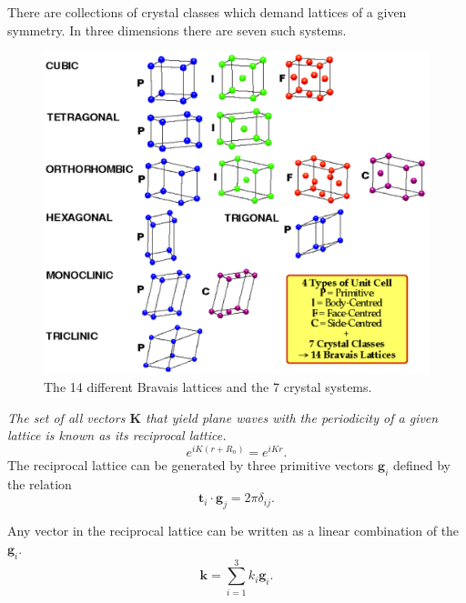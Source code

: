 \documentclass[12pt,a4paper,english]{beamer}
\newcommand{\mbf}{ \mathbf }
\begin{document}
\begin{frame}
  There are collections of crystal classes which demand lattices of a given
  symmetry. 
  In three dimensions there are seven such systems.

  \begin{figure}[htp]
\centering
\includegraphics[scale=0.3]{Bravais}
\caption{The 14 different Bravais lattices and the 7 crystal systems.}
\label{fig:bravais}
\end{figure}
\end{frame}

\begin{frame}
  \emph{The set of all vectors $\mbf{K}$ that yield plane waves with the periodicity of a given lattice is known as its reciprocal lattice.}
  $$e^{iK(r+R_n)}=e^{iKr}.$$
  The reciprocal lattice can be generated by three primitive vectors $\mbf g_i$
  defined by the relation 
  $$\mbf t_i\cdot \mbf g_j=2\pi\delta_{ij}.$$

  Any vector in the reciprocal lattice can be written as a linear combination of  the $\mbf g_i.$
  $$\mbf k= \sum_{i=1}^3 k_i\mbf g_i.$$

\end{frame}

\end{document}
